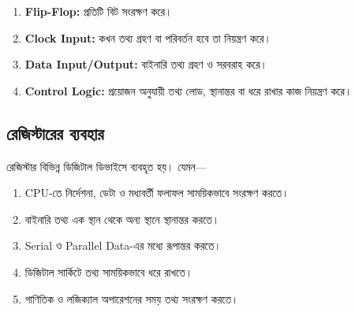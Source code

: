 \begin{enumerate}[leftmargin=*,itemsep=2pt]

    \item \textbf{\textenglish{Flip-Flop}:}
    প্রতিটি বিট সংরক্ষণ করে।

    \item \textbf{\textenglish{Clock Input}:}
    কখন তথ্য গ্রহণ বা পরিবর্তন হবে তা নিয়ন্ত্রণ করে।

    \item \textbf{\textenglish{Data Input/Output}:}
    বাইনারি তথ্য গ্রহণ ও সরবরাহ করে।

    \item \textbf{\textenglish{Control Logic}:}
    প্রয়োজন অনুযায়ী তথ্য লোড, স্থানান্তর বা ধরে রাখার কাজ নিয়ন্ত্রণ করে।

\end{enumerate}



\subsection{রেজিস্টারের ব্যবহার}

রেজিস্টার বিভিন্ন ডিজিটাল ডিভাইসে ব্যবহৃত হয়। যেমন—

\begin{enumerate}[leftmargin=*,itemsep=2pt]

    \item \textenglish{CPU}-তে নির্দেশনা, ডেটা ও মধ্যবর্তী ফলাফল
    সাময়িকভাবে সংরক্ষণ করতে।

    \item বাইনারি তথ্য এক স্থান থেকে অন্য স্থানে স্থানান্তর করতে।

    \item \textenglish{Serial} ও \textenglish{Parallel Data}-এর মধ্যে
    রূপান্তর করতে।

    \item ডিজিটাল সার্কিটে তথ্য সাময়িকভাবে ধরে রাখতে।

    \item গাণিতিক ও লজিক্যাল অপারেশনের সময় তথ্য সংরক্ষণ করতে।

\end{enumerate}



